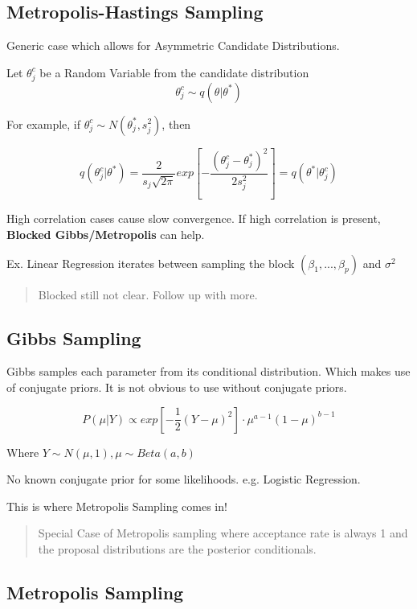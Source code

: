 \documentclass[11pt]{article}
\begin{document}
\subsection{Metropolis-Hastings Sampling}
\label{sec:org419c0c3}

Generic case which allows for Asymmetric Candidate Distributions.

Let \(\theta_j^c\) be a Random Variable from the candidate distribution
$$\theta_j^c \sim q(\theta | \theta^*)$$

For example, if \(\theta_j^c \sim N(\theta_j^*, s_j^2)\), then

$$
q(\theta_j^c | \theta^*) = \frac{2}{s_j \sqrt{2 \pi}}exp[- \frac{(\theta_j^c -
\theta_j^*)^2}{2 s_j^2}] = q(\theta^* | \theta_j^c)
$$

High correlation cases cause slow convergence. If high correlation is present,
\textbf{Blocked Gibbs/Metropolis} can help.

Ex. Linear Regression iterates between sampling the block \((\beta_1, ...,
\beta_p)\) and \(\sigma^2\)

\begin{quote}
Blocked still not clear. Follow up with more.
\end{quote}

\subsection{Gibbs Sampling}
\label{sec:org1056938}

Gibbs samples each parameter from its conditional distribution. Which makes use
of conjugate priors. It is not obvious to use without conjugate priors.

$$P(\mu | Y ) \propto exp[- \frac{1}{2} (Y - \mu)^2] \cdot \mu^{a - 1} (1 -
\mu)^{b - 1}$$

Where \(Y \sim N(\mu, 1), \mu \sim Beta(a,b)\)

No known conjugate prior for some likelihoods. e.g. Logistic Regression.

This is where Metropolis Sampling comes in!

\begin{quote}
Special Case of Metropolis sampling where acceptance rate is always 1 and the
proposal distributions are the posterior conditionals.
\end{quote}

\subsection{Metropolis Sampling}
\label{sec:org9df27ad}
\end{document}
